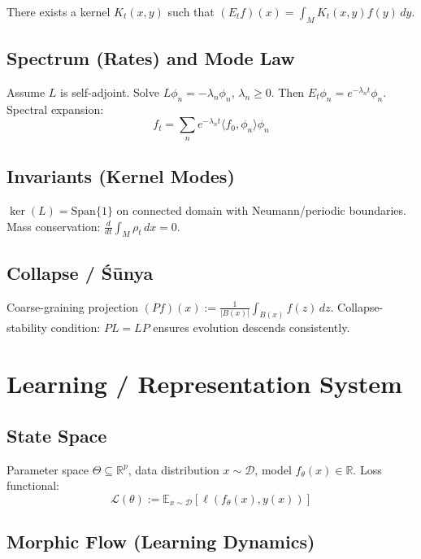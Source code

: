 \documentclass[12pt, oneside]{article}
\begin{document}
There exists a kernel $K_t(x,y)$ such that $(E_t f)(x) = \int_M K_t(x,y) f(y) \, dy$.

\subsection{Spectrum (Rates) and Mode Law}

Assume $L$ is self-adjoint. Solve $L \phi_n = -\lambda_n \phi_n$, $\lambda_n \geq 0$. Then $E_t \phi_n = e^{-\lambda_n t} \phi_n$. Spectral expansion:
\begin{equation}
f_t = \sum_n e^{-\lambda_n t} \langle f_0, \phi_n \rangle \phi_n
\end{equation}

\subsection{Invariants (Kernel Modes)}

$\ker(L) = \text{Span}\{1\}$ on connected domain with Neumann/periodic boundaries. Mass conservation: $\frac{d}{dt} \int_M \rho_t \, dx = 0$.

\subsection{Collapse / Śūnya}

Coarse-graining projection $(Pf)(x) := \frac{1}{|B(x)|} \int_{B(x)} f(z) \, dz$. Collapse-stability condition: $PL = LP$ ensures evolution descends consistently.

\section{Learning / Representation System}

\subsection{State Space}

Parameter space $\Theta \subseteq \mathbb{R}^p$, data distribution $x \sim \mathcal{D}$, model $f_\theta(x) \in \mathbb{R}$. Loss functional:
\begin{equation}
\mathcal{L}(\theta) := \mathbb{E}_{x \sim \mathcal{D}} [\ell(f_\theta(x), y(x))]
\end{equation}

\subsection{Morphic Flow (Learning Dynamics)}
\end{document}
